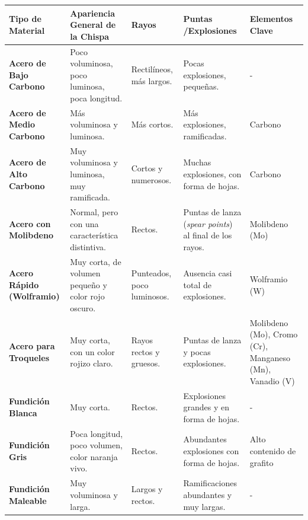 \documentclass[12pt,a4paper]{article}
\begin{document}
\begin{table}[h!]
    \centering
    \begin{tabularx}{\textwidth}{>{\raggedright\arraybackslash}p{} >{\raggedright\arraybackslash}p{} >{\raggedright\arraybackslash}p{} >{\raggedright\arraybackslash}p{} >{\raggedright\arraybackslash}p{}}
        \toprule
        \textbf{Tipo de Material} & \textbf{Apariencia General de la Chispa} & \textbf{Rayos} & \textbf{Puntas
        /Explosiones} & \textbf{Elementos Clave} \\
        \midrule
        \textbf{Acero de Bajo Carbono} & Poco voluminosa, poco luminosa, poca longitud. & Rectilíneos, más largos. & Pocas explosiones, pequeñas. & - \\ \hline
        \textbf{Acero de Medio Carbono} & Más voluminosa y luminosa. & Más cortos. & Más explosiones, ramificadas. & Carbono \\ \hline
        \textbf{Acero de Alto Carbono} & Muy voluminosa y luminosa, muy ramificada. & Cortos y numerosos. & Muchas explosiones, con forma de hojas. & Carbono \\ \hline
        \textbf{Acero con Molibdeno} & Normal, pero con una característica distintiva. & Rectos. & Puntas de lanza (\textit{spear points}) al final de los rayos. & Molibdeno (Mo) \\ \hline
        \textbf{Acero Rápido (Wolframio)} & Muy corta, de volumen pequeño y color rojo oscuro. & Punteados, poco luminosos. & Ausencia casi total de explosiones. & Wolframio (W) \\ \hline
        \textbf{Acero para Troqueles} & Muy corta, con un color rojizo claro. & Rayos rectos y gruesos. & Puntas de lanza y pocas explosiones. & Molibdeno (Mo), Cromo (Cr), Manganeso (Mn), Vanadio (V) \\ \hline
        \textbf{Fundición Blanca} & Muy corta. & Rectos. & Explosiones grandes y en forma de hojas. & - \\ \hline
        \textbf{Fundición Gris} & Poca longitud, poco volumen, color naranja vivo. & Rectos. & Abundantes explosiones con forma de hojas. & Alto contenido de grafito \\ \hline
        \textbf{Fundición Maleable} & Muy voluminosa y larga. & Largos y rectos. & Ramificaciones abundantes y muy largas. & - \\ 
        \bottomrule
    \end{tabularx}
\end{table}
\end{document}
